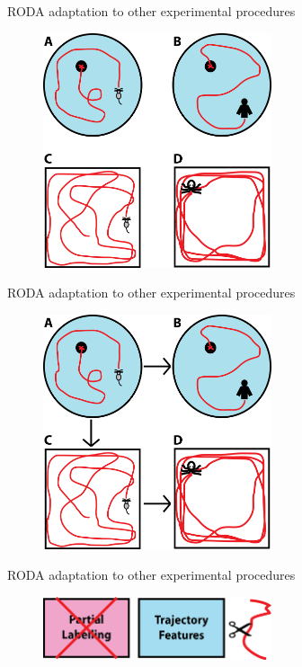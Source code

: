 \documentclass{beamer}
\begin{document}
{\begin{frame}{RODA adaptation to other experimental procedures}
	\begin{figure}[H]
		\centering
		\includegraphics[width=0.6\textwidth]{figures/MWM+OF1}
	\end{figure}
\end{frame}
\begin{frame}{RODA adaptation to other experimental procedures}
	\begin{figure}[H]
		\centering
		\includegraphics[width=0.6\textwidth]{figures/MWM+OF2}
	\end{figure}
\end{frame}

\begin{frame}{RODA adaptation to other experimental procedures}
	\begin{figure}[H]
		\centering
		\includegraphics[width=0.6\textwidth]{figures/future}
	\end{figure}
\end{frame}

}
\end{document}
